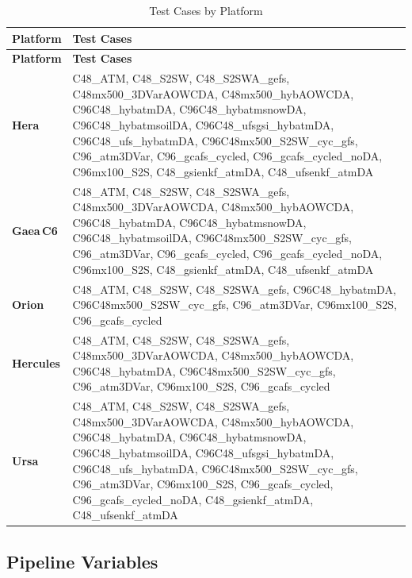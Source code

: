 \documentclass[11pt,letterpaper,twoside]{article}
\begin{document}
\begin{longtable}{p{2cm}p{12cm}}
\caption{Test Cases by Platform} \label{tab:host-cases} \\
\toprule
\textbf{Platform} & \textbf{Test Cases} \\
\midrule
\endfirsthead
\toprule
\textbf{Platform} & \textbf{Test Cases} \\
\midrule
\endhead
\bottomrule
\endfoot

\textbf{Hera} &
  C48\_ATM, C48\_S2SW, C48\_S2SWA\_gefs,
  C48mx500\_3DVarAOWCDA, C48mx500\_hybAOWCDA,
  C96C48\_hybatmDA, C96C48\_hybatmsnowDA, C96C48\_hybatmsoilDA,
  C96C48\_ufsgsi\_hybatmDA, C96C48\_ufs\_hybatmDA,
  C96C48mx500\_S2SW\_cyc\_gfs, C96\_atm3DVar,
  C96\_gcafs\_cycled, C96\_gcafs\_cycled\_noDA,
  C96mx100\_S2S, C48\_gsienkf\_atmDA, C48\_ufsenkf\_atmDA \\
\midrule

\textbf{Gaea\,C6} &
  C48\_ATM, C48\_S2SW, C48\_S2SWA\_gefs,
  C48mx500\_3DVarAOWCDA, C48mx500\_hybAOWCDA,
  C96C48\_hybatmDA, C96C48\_hybatmsnowDA, C96C48\_hybatmsoilDA,
  C96C48mx500\_S2SW\_cyc\_gfs, C96\_atm3DVar,
  C96\_gcafs\_cycled, C96\_gcafs\_cycled\_noDA,
  C96mx100\_S2S, C48\_gsienkf\_atmDA, C48\_ufsenkf\_atmDA \\
\midrule

\textbf{Orion} &
  C48\_ATM, C48\_S2SW, C48\_S2SWA\_gefs,
  C96C48\_hybatmDA, C96C48mx500\_S2SW\_cyc\_gfs,
  C96\_atm3DVar, C96mx100\_S2S, C96\_gcafs\_cycled \\
\midrule

\textbf{Hercules} &
  C48\_ATM, C48\_S2SW, C48\_S2SWA\_gefs,
  C48mx500\_3DVarAOWCDA, C48mx500\_hybAOWCDA,
  C96C48\_hybatmDA, C96C48mx500\_S2SW\_cyc\_gfs,
  C96\_atm3DVar, C96mx100\_S2S, C96\_gcafs\_cycled \\
\midrule

\textbf{Ursa} &
  C48\_ATM, C48\_S2SW, C48\_S2SWA\_gefs,
  C48mx500\_3DVarAOWCDA, C48mx500\_hybAOWCDA,
  C96C48\_hybatmDA, C96C48\_hybatmsnowDA, C96C48\_hybatmsoilDA,
  C96C48\_ufsgsi\_hybatmDA, C96C48\_ufs\_hybatmDA,
  C96C48mx500\_S2SW\_cyc\_gfs, C96\_atm3DVar,
  C96mx100\_S2S, C96\_gcafs\_cycled, C96\_gcafs\_cycled\_noDA,
  C48\_gsienkf\_atmDA, C48\_ufsenkf\_atmDA \\

\end{longtable}

\subsection{Pipeline Variables}
\label{sec:pipeline-vars}
\end{document}
